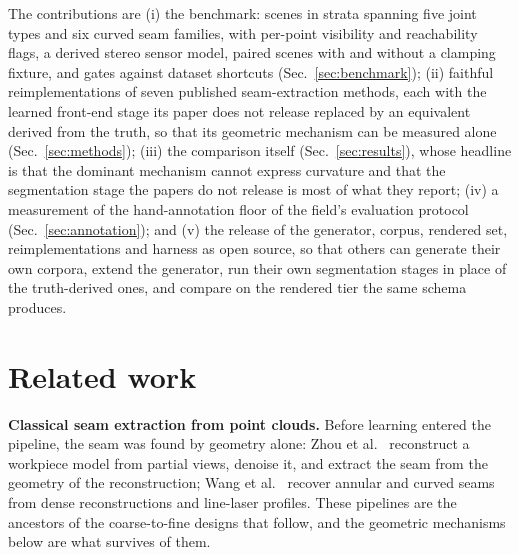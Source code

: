 \documentclass[letterpaper, 10 pt, conference]{ieeeconf}
\begin{document}
The contributions are (i) the benchmark: \nScenes{} scenes in \nStrata{} strata spanning five joint types and six curved seam families, with per-point visibility and reachability flags, a derived stereo sensor model, paired scenes with and without a clamping fixture, and gates against dataset shortcuts (Sec.~\ref{sec:benchmark}); (ii) faithful reimplementations of seven published seam-extraction methods, each with the learned front-end stage its paper does not release replaced by an equivalent derived from the truth, so that its geometric mechanism can be measured alone (Sec.~\ref{sec:methods}); (iii) the comparison itself (Sec.~\ref{sec:results}), whose headline is that the dominant mechanism cannot express curvature and that the segmentation stage the papers do not release is most of what they report; (iv) a measurement of the hand-annotation floor of the field's evaluation protocol (Sec.~\ref{sec:annotation}); and (v) the release of the generator, corpus, rendered set, reimplementations and harness as open source, so that others can generate their own corpora, extend the generator, run their own segmentation stages in place of the truth-derived ones, and compare on the rendered tier the same schema produces.

\section{Related work}\label{sec:related}

\textbf{Classical seam extraction from point clouds.} Before learning entered the pipeline, the seam was found by geometry alone: Zhou et al.~\cite{zhou2020pathplanning} reconstruct a workpiece model from partial views, denoise it, and extract the seam from the geometry of the reconstruction; Wang et al.~\cite{wang2023tubesheet,wang2025laser} recover annular and curved seams from dense reconstructions and line-laser profiles. These pipelines are the ancestors of the coarse-to-fine designs that follow, and the geometric mechanisms below are what survives of them.
\end{document}
